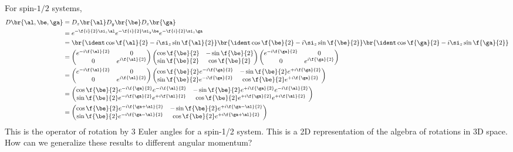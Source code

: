 \documentclass{article}
\begin{document}
For spin-$1/2$ systems,
\begin{align*}
    D\br{\al, \be, \ga}
    &= D_z\br{\al}D_y\br{\be}D_z\br{\ga} \\
    &= e^{-\f{i}{2} \si_z \al}e^{-\f{i}{2} \si_y \be}e^{-\f{i}{2} \si_z \ga}  \\
    &= \br{\ident \cos \f{\al}{2} - i \si_z \sin \f{\al}{2}}\br{\ident \cos \f{\be}{2} - i \si_z \sin \f{\be}{2}}\br{\ident \cos \f{\ga}{2} - i \si_z \sin \f{\ga}{2}}\\
    &=
    \begin{pmatrix}
        e^{-i\f{\al}{2}} & 0 \\
        0 & e^{i\f{\al}{2}} \\
    \end{pmatrix}
    \begin{pmatrix}
        \cos \f{\be}{2} & -\sin \f{\be}{2} \\
        \sin \f{\be}{2} & \cos \f{\be}{2} \\
    \end{pmatrix}
    \begin{pmatrix}
        e^{-i\f{\ga}{2}} & 0 \\
        0 & e^{i\f{\ga}{2}} \\
    \end{pmatrix}
    \\
    &=
    \begin{pmatrix}
        e^{-i\f{\al}{2}} & 0 \\
        0 & e^{i\f{\al}{2}} \\
    \end{pmatrix}
    \begin{pmatrix}
        \cos \f{\be}{2}e^{-i\f{\ga}{2}} & -\sin \f{\be}{2}e^{+i\f{\ga}{2}} \\
        \sin \f{\be}{2}e^{-i\f{\ga}{2}} & \cos \f{\be}{2}e^{+i\f{\ga}{2}} \\
    \end{pmatrix}
    \\
    &=
    \begin{pmatrix}
        \cos \f{\be}{2}e^{-i\f{\ga}{2}}e^{-i\f{\al}{2}} & -\sin \f{\be}{2}e^{+i\f{\ga}{2}}e^{-i\f{\al}{2}} \\
        \sin \f{\be}{2}e^{-i\f{\ga}{2}}e^{+i\f{\al}{2}} & \cos \f{\be}{2}e^{+i\f{\ga}{2}}e^{+i\f{\al}{2}} \\
    \end{pmatrix}
    \\
    &= \begin{pmatrix}
        \cos \f{\be}{2}e^{-i\f{\ga+\al}{2}} & -\sin \f{\be}{2}e^{+i\f{\ga-\al}{2}} \\
        \sin \f{\be}{2}e^{-i\f{\ga - \al}{2}} & \cos \f{\be}{2}e^{+i\f{\ga+\al}{2}} \\
    \end{pmatrix}
    \\
\end{align*}
This is the operator of rotation by $3$ Euler angles for a spin-1/2 system. This is a 2D representation of the algebra of rotations in 3D space. How can we generalize these results to different angular momentum?
\end{document}
